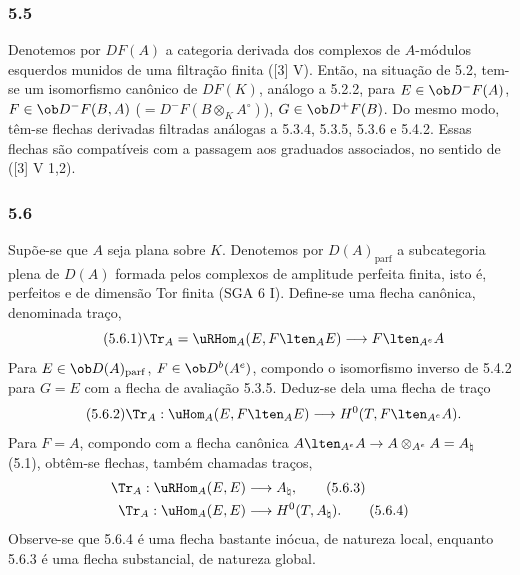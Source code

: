 \subsubsection*{5.5}

Denotemos por $DF(A)$ a categoria derivada dos complexos de $A$-módulos esquerdos munidos de uma filtração finita ([3] V). Então, na situação de 5.2, tem-se um isomorfismo canônico de $DF(K)$, análogo a 5.2.2, para $E\in\ob D^-F(A)$, $F\in\ob D^-F(B,A)$ ($=D^-F(B\otimes_KA^\circ)$), $G\in\ob D^+F(B)$. Do mesmo modo, têm-se flechas derivadas filtradas análogas a 5.3.4, 5.3.5, 5.3.6 e 5.4.2. Essas flechas são compatíveis com a passagem aos graduados associados, no sentido de ([3] V 1,2).

\subsubsection*{5.6}

Supõe-se que $A$ seja plana sobre $K$. Denotemos por $D(A)_{\mathrm{parf}}$ a subcategoria plena de $D(A)$ formada pelos complexos de amplitude perfeita finita, isto é, perfeitos e de dimensão Tor finita (SGA 6 I). Define-se uma flecha canônica, denominada traço,
\begin{equation}\tag{5.6.1}
\Tr_A=\uRHom_A(E,F\lten_AE)\longrightarrow F\lten_{A^e}A
\end{equation}
Para $E\in\ob D(A)_{\mathrm{parf}}$, $F\in\ob D^b(A^e)$, compondo o isomorfismo inverso de 5.4.2 para $G=E$ com a flecha de avaliação 5.3.5. Deduz-se dela uma flecha de traço
\begin{equation}\tag{5.6.2}
\Tr_A:\uHom_A(E,F\lten_AE)\longrightarrow H^0(T,F\lten_{A^e}A).
\end{equation}
Para $F=A$, compondo com a flecha canônica $A\lten_{A^e}A\to A\otimes_{A^e}A=A_\natural$ (5.1), obtêm-se flechas, também chamadas traços,
\begin{align}
\Tr_A:\uRHom_A(E,E)&\longrightarrow A_\natural,\tag{5.6.3}\\
\Tr_A:\uHom_A(E,E)&\longrightarrow H^0(T,A_\natural).\tag{5.6.4}
\end{align}
Observe-se que 5.6.4 é uma flecha bastante inócua, de natureza local, enquanto 5.6.3 é uma flecha substancial, de natureza global.

